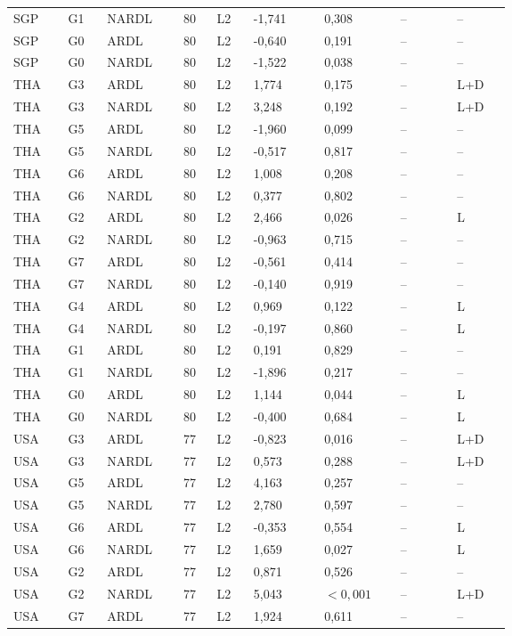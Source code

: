 {\begin{longtable}{p{0.075\linewidth}p{0.05\linewidth}p{0.09\linewidth}p{0.04\linewidth}p{0.05\linewidth}p{0.1\linewidth}p{0.085\linewidth}p{0.085\linewidth}p{0.075\linewidth}}
SGP & G1 & NARDL & 80 & L2 & -1,741 & 0,308 & -- & --\\
SGP & G0 & ARDL & 80 & L2 & -0,640 & 0,191 & -- & --\\
SGP & G0 & NARDL & 80 & L2 & -1,522 & 0,038 & -- & --\\
THA & G3 & ARDL & 80 & L2 & 1,774 & 0,175 & -- & L+D\\
THA & G3 & NARDL & 80 & L2 & 3,248 & 0,192 & -- & L+D\\
THA & G5 & ARDL & 80 & L2 & -1,960 & 0,099 & -- & --\\
THA & G5 & NARDL & 80 & L2 & -0,517 & 0,817 & -- & --\\
THA & G6 & ARDL & 80 & L2 & 1,008 & 0,208 & -- & --\\
THA & G6 & NARDL & 80 & L2 & 0,377 & 0,802 & -- & --\\
THA & G2 & ARDL & 80 & L2 & 2,466 & 0,026 & -- & L\\
THA & G2 & NARDL & 80 & L2 & -0,963 & 0,715 & -- & --\\
THA & G7 & ARDL & 80 & L2 & -0,561 & 0,414 & -- & --\\
THA & G7 & NARDL & 80 & L2 & -0,140 & 0,919 & -- & --\\
THA & G4 & ARDL & 80 & L2 & 0,969 & 0,122 & -- & L\\
THA & G4 & NARDL & 80 & L2 & -0,197 & 0,860 & -- & L\\
THA & G1 & ARDL & 80 & L2 & 0,191 & 0,829 & -- & --\\
THA & G1 & NARDL & 80 & L2 & -1,896 & 0,217 & -- & --\\
THA & G0 & ARDL & 80 & L2 & 1,144 & 0,044 & -- & L\\
THA & G0 & NARDL & 80 & L2 & -0,400 & 0,684 & -- & L\\
USA & G3 & ARDL & 77 & L2 & -0,823 & 0,016 & -- & L+D\\
USA & G3 & NARDL & 77 & L2 & 0,573 & 0,288 & -- & L+D\\
USA & G5 & ARDL & 77 & L2 & 4,163 & 0,257 & -- & --\\
USA & G5 & NARDL & 77 & L2 & 2,780 & 0,597 & -- & --\\
USA & G6 & ARDL & 77 & L2 & -0,353 & 0,554 & -- & L\\
USA & G6 & NARDL & 77 & L2 & 1,659 & 0,027 & -- & L\\
USA & G2 & ARDL & 77 & L2 & 0,871 & 0,526 & -- & --\\
USA & G2 & NARDL & 77 & L2 & 5,043 & \(<0{,}001\) & -- & L+D\\
USA & G7 & ARDL & 77 & L2 & 1,924 & 0,611 & -- & --\\

\end{longtable}}
